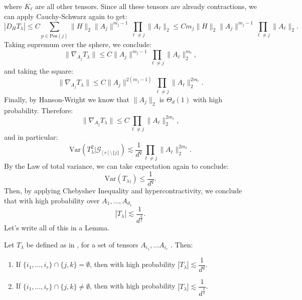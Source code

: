\documentclass[]{article}
\numberwithin{equation}{section}
\theoremstyle{definition}
\begin{document}
where $K_{\ell}$ are all other tensors. Since all these tensors are already contractions, we can apply Cauchy-Schwarz again to get: 
\begin{equation}
    \left | D_{H} T_{\lambda } \right | \leq C \sum_{p \in \mathrm{Pos}(j)} \|H\|_2 \| A_{j}\|^{m_{j}-1}\prod_{\ell \not = j} \| A_{\ell}\|_2 \leq Cm_{j} \|H\|_2 \| A_{j}\|^{m_{j}-1}\prod_{\ell \not = j} \| A_{\ell}\|_2 .
\end{equation}
Taking supremum over the sphere, we conclude: 
\begin{equation}
    \| \nabla_{A_{j}} T_{\lambda}\| \leq C \| A_{j}\|^{m_{j}-1}\prod_{\ell \not = j} \| A_{\ell}\|_2^{m_\ell},
\end{equation}
and taking the square: 
\begin{equation}
     \| \nabla_{A_{j}} T_{\lambda}\| \leq C \| A_{j}\|^{2(m_{j}-1)}\prod_{\ell \not = j} \| A_{\ell}\|_2^{2m_{\ell}}.
\end{equation}
Finally, by Hanson-Wright we know that $\| A_{j}\|_2$ is $\Theta_d(1)$ with high probability. Therefore:
\begin{equation}
    \| \nabla_{A_{j}} T_{\lambda}\| \leq C \prod_{\ell \not = j} \| A_{\ell}\|_2^{2m_{\ell}},
\end{equation}
and in particular: 
\begin{equation}
    \mathrm{Var}(T_\lambda^{2} |\mathcal{G}_{[r]\setminus\{j\}}) \lesssim \dfrac{1}{d^{q}}\prod_{\ell \not = j} \| A_{\ell}\|_2^{2m_{\ell}}.
\end{equation}
By the Law of total variance, we can take expectation again to conclude: 
\begin{equation}
    \mathrm{Var}(T_{\lambda)}) \leq \dfrac{1}{d^{q}} . 
\end{equation}
Then, by applying Chebyshev Inequality and hypercontractivity, we conclude that with high probability over $A_{1}, \dots, A_{d_1}$
\begin{equation}
    |T_{\lambda}| \lesssim \dfrac{1}{d^{\frac{q}{2}}}. 
\end{equation}
Let's write all of this in a Lemma. 

\begin{lemma}
    Let $T_{\lambda}$ be defined as in , for a
    set of tensors $A_{i_{1}}, \dots A_{i_{r}}$ . Then: 
    \begin{enumerate}
        \item If $\{ i_{1}, \dots, i_{r}\} \cap \{j,k\} = \emptyset$, then with high probability $|T_{\lambda}| \lesssim \dfrac{1}{d^{q}}$. 
        \item If $\{ i_{1}, \dots, i_{r}\} \cap \{j,k\} \not = \emptyset$, then with high probability $|T_{\lambda}| \lesssim \dfrac{1}{d^{\frac{q}{2}}}$.
    \end{enumerate}
    \label{lemma:control_T_lambda}
\end{lemma}
\end{document}
